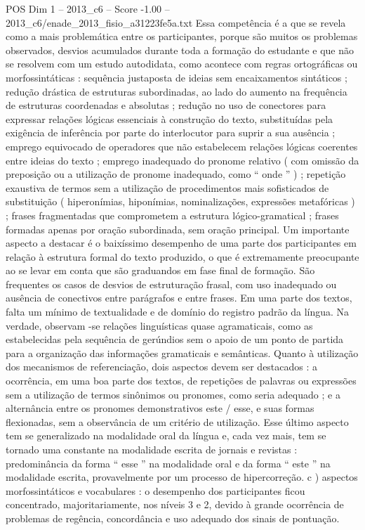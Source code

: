 \begin{textsample}{POS Dim 1 – 2013\_c6 – Score -1.00 – 2013\_c6/enade\_2013\_fisio\_a31223fe5a.txt}
Essa competência é a que se revela como a mais problemática entre os participantes, porque são muitos os problemas observados, desvios acumulados durante toda a formação do estudante e que não se resolvem com um estudo autodidata, como acontece com regras ortográficas ou morfossintáticas : sequência justaposta de ideias sem encaixamentos sintáticos ; redução drástica de estruturas subordinadas, ao lado do aumento na frequência de estruturas coordenadas e absolutas ; redução no uso de conectores para expressar relações lógicas essenciais à construção do texto, substituídas pela exigência de inferência por parte do interlocutor para suprir a sua ausência ; emprego equivocado de operadores que não estabelecem relações lógicas coerentes entre ideias do texto ; emprego inadequado do pronome relativo ( com omissão da preposição ou a utilização de pronome inadequado, como “ onde ” ) ; repetição exaustiva de termos sem a utilização de procedimentos mais sofisticados de substituição ( hiperonímias, hiponímias, nominalizações, expressões metafóricas ) ; frases fragmentadas que comprometem a estrutura lógico-gramatical ; frases formadas apenas por oração subordinada, sem oração principal.
Um importante aspecto a destacar é o baixíssimo desempenho de uma parte dos participantes em relação à estrutura formal do texto produzido, o que é extremamente preocupante ao se levar em conta que são graduandos em fase final de formação.
São frequentes os casos de desvios de estruturação frasal, com uso inadequado ou ausência de conectivos entre parágrafos e entre frases.
Em uma parte dos textos, falta um mínimo de textualidade e de domínio do registro padrão da língua.
Na verdade, observam -se relações linguísticas quase agramaticais, como as estabelecidas pela sequência de gerúndios sem o apoio de um ponto de partida para a organização das informações gramaticais e semânticas.
Quanto à utilização dos mecanismos de referenciação, dois aspectos devem ser destacados : a ocorrência, em uma boa parte dos textos, de repetições de palavras ou expressões sem a utilização de termos sinônimos ou pronomes, como seria adequado ; e a alternância entre os pronomes demonstrativos este / esse, e suas formas flexionadas, sem a observância de um critério de utilização.
Esse último aspecto tem se generalizado na modalidade oral da língua e, cada vez mais, tem se tornado uma constante na modalidade escrita de jornais e revistas : predominância da forma “ esse ” na modalidade oral e da forma “ este ” na modalidade escrita, provavelmente por um processo de hipercorreção. c ) aspectos morfossintáticos e vocabulares : o desempenho dos participantes ficou concentrado, majoritariamente, nos níveis 3 e 2, devido à grande ocorrência de problemas de regência, concordância e uso adequado dos sinais de pontuação.

\end{textsample}
